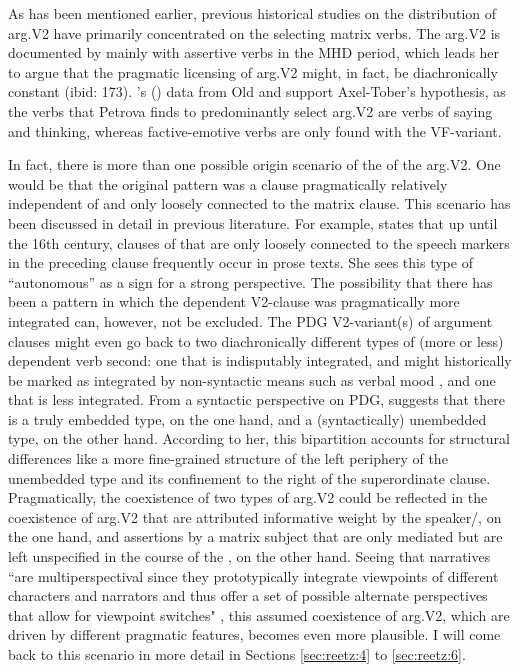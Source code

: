 \documentclass[output=paper,colorlinks,citecolor=brown]{langscibook}
\begin{document}
As has been mentioned earlier, previous historical studies on the distribution of arg.V2 have primarily concentrated on the selecting matrix verbs. The arg.V2 is documented by \citet{Axel2012} mainly with assertive verbs  in the MHD period, which leads her to argue that the pragmatic licensing of arg.V2 might, in fact, be diachronically constant (ibid: 173). \citeauthor{Petrova2020a}'s (\citeyear{Petrova2020b, Petrova2020a}) data from Old and  support Axel-Tober's hypothesis, as the verbs that Petrova finds to predominantly select arg.V2 are verbs of saying and thinking, whereas factive-emotive verbs are only found with the VF-variant.

In fact, there is more than one possible origin scenario of the of the arg.V2. One would be that the original pattern was a clause pragmatically relatively independent of and only loosely connected to the matrix clause. This scenario has been discussed in detail in previous literature. For example, \citet{Demske2019} states that up until the 16th century, clauses of  that are only loosely connected to the speech markers in the preceding clause frequently occur in prose texts. She sees this type of “autonomous”  as a sign for a strong  perspective. The possibility that there has been a pattern in which the dependent V2-clause was pragmatically more integrated can, however, not be excluded. The PDG V2-variant(s) of argument clauses might even go back to two diachronically different types of (more or less) dependent verb second: one that is indisputably integrated, and might historically be marked as integrated by non-syntactic means such as verbal mood \citep{GärtnerEythórsson2020, ConiglioWeskott2021}, and one that is less integrated. From a syntactic perspective on PDG, \citet{Freywald2016} suggests that there is a truly embedded type, on the one hand, and a (syntactically) unembedded type, on the other hand. According to her, this bipartition accounts for structural differences like a more fine-grained structure of the left periphery of the unembedded type and its confinement to the right of the superordinate clause. Pragmatically, the coexistence of two types of arg.V2 could be reflected in the coexistence of arg.V2 that are attributed informative weight by the speaker/, on the one hand, and assertions by a matrix subject that are only mediated but are left unspecified in the course of the , on the other hand. Seeing that narratives “are multiperspectival since they prototypically integrate viewpoints of different characters and narrators and thus offer a set of possible alternate perspectives that allow for viewpoint switches" \citep[2]{Zeman2020a}, this assumed coexistence of arg.V2, which are driven by different pragmatic features, becomes even more plausible. I will come back to this scenario in more detail in Sections \ref{sec:reetz:4} to \ref{sec:reetz:6}.
\end{document}
